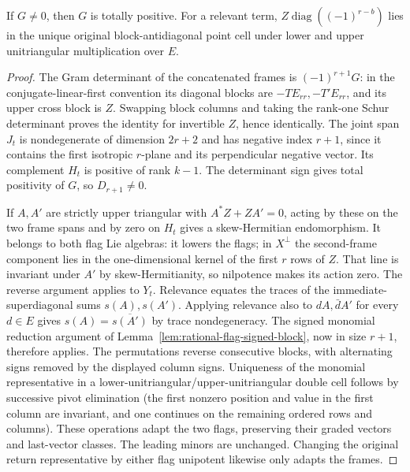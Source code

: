 \begin{lemma}
If \(G\ne0\), then \(G\) is totally positive. For a relevant term,
\(Z\operatorname{diag}((-1)^{r-b})\) lies in the unique original
block-antidiagonal point cell under lower and upper unitriangular
multiplication over \(E\).
\end{lemma}
\begin{proof}
The Gram determinant of the concatenated frames is
\((-1)^{r+1}G\): in the conjugate-linear-first convention its
diagonal blocks are \(-TE_{rr},-T'E_{rr}\), and its upper cross
block is \(Z\). Swapping block columns and taking the rank-one
Schur determinant proves the identity for invertible \(Z\),
hence identically. The joint span \(J_t\) is nondegenerate of
dimension \(2r+2\) and has negative index \(r+1\), since it
contains the first isotropic \(r\)-plane and its perpendicular
negative vector. Its complement \(H_t\) is positive of rank
\(k-1\). The determinant sign gives total positivity of \(G\),
so \(D_{r+1}\ne0\).

If \(A,A'\) are strictly upper triangular with
\(A^*Z+ZA'=0\), acting by these on the two frame spans and by
zero on \(H_t\) gives a skew-Hermitian endomorphism. It belongs
to both flag Lie algebras: it lowers the flags; in \(X^\perp\)
the second-frame component lies in the one-dimensional kernel
of the first \(r\) rows of \(Z\). That line is invariant under
\(A'\) by skew-Hermitianity, so nilpotence makes its action zero.
The reverse argument applies to \(Y_t\). Relevance equates the
traces of the immediate-superdiagonal sums \(s(A),s(A')\).
Applying relevance also to \(dA,\bar d A'\) for every \(d\in E\)
gives \(s(A)=\overline{s(A')}\) by trace nondegeneracy.
The signed monomial reduction argument of
Lemma~\ref{lem:rational-flag-signed-block}, now in size \(r+1\),
therefore applies. The permutations reverse consecutive blocks,
with alternating signs removed by the displayed column signs.
Uniqueness of the monomial representative in a
lower-unitriangular/upper-unitriangular double cell follows by
successive pivot elimination (the first nonzero position and
value in the first column are invariant, and one continues on
the remaining ordered rows and columns). These operations adapt
the two flags, preserving their graded vectors and last-vector
classes. The leading minors are unchanged. Changing the original
return representative by either flag unipotent likewise
only adapts the frames.
\end{proof}

